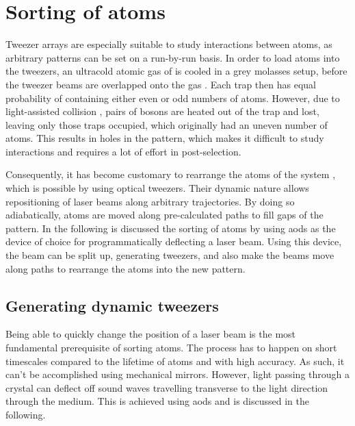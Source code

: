 \chapter{Sorting of atoms}


Tweezer arrays are especially suitable to study interactions between atoms, as arbitrary patterns can be set on a run-by-run basis. In order to load atoms into the tweezers, an ultracold atomic gas of  is cooled in a grey molasses setup, before the tweezer beams are overlapped onto the gas \cite{Duda2017}. Each trap then has equal probability of containing either even or odd numbers of atoms. However, due to light-assisted collision \cite{Cooper2018}, pairs of bosons are heated out of the trap and lost, leaving only those traps occupied, which originally had an uneven number of atoms. This results in holes in the pattern, which makes it difficult to study interactions and requires a lot of effort in post-selection.

Consequently, it has become customary to rearrange the atoms of the system \cite{Barredo2016, Endres2016}, which is possible by using optical tweezers. Their dynamic nature allows repositioning of laser beams along arbitrary trajectories. By doing so adiabatically, atoms are moved along pre-calculated paths to fill gaps of the pattern. In the following is discussed the sorting of atoms by using \acp{aod} as the device of choice for programmatically deflecting a laser beam. Using this device, the beam can be split up, generating tweezers, and also make the beams move along paths to rearrange the atoms into the new pattern.


\section{Generating dynamic tweezers}

Being able to quickly change the position of a laser beam is the most fundamental prerequisite of sorting atoms. The process has to happen on short timescales compared to the lifetime of atoms and with high accuracy. As such, it can't be accomplished using mechanical mirrors. However, light passing through a crystal can deflect off sound waves travelling transverse to the light direction through the medium. This is achieved using \acp{aod} and is discussed in the following.

